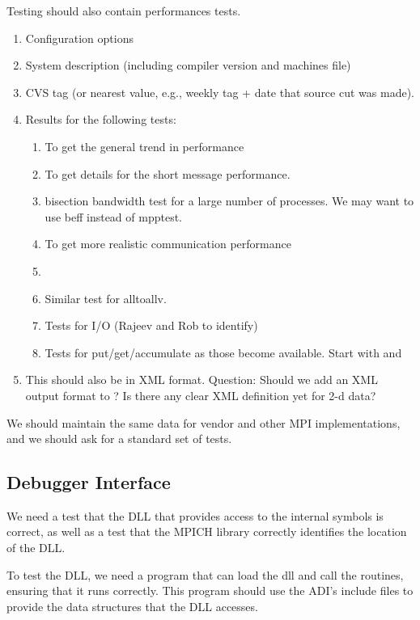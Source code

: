 \documentclass{article}
\begin{document}
Testing should also contain performances tests.
\begin{enumerate}
\item Configuration options
\item System description (including compiler version and machines file)
\item CVS tag (or nearest value, e.g., weekly tag + date that source
cut was made).
\item Results for the following tests:
    \begin{enumerate}
    \item {} To get the general trend in performance
    \item {} To get details for the short message
performance. 
    \item bisection bandwidth test for a large number of processes.
    We may want to use beff instead of mpptest.
    \item {} To get more
    realistic communication performance
    \item {} 
    \item Similar test for alltoallv. 
    \item Tests for I/O (Rajeev and Rob to identify)
    \item Tests for put/get/accumulate as those become available.
    Start with  and 
    \end{enumerate}
\item This should also be in XML format.
    Question: Should we add an XML output format to ?
Is there any clear XML definition yet for 2-d data?

\end{enumerate}
We should maintain the same data for vendor and other MPI
implementations, and we should ask for a standard set of tests.  

\subsection{Debugger Interface}
\label{sec:debug-interface}
We need a test that the DLL that provides access to the internal
symbols is correct, as well as a test that the MPICH library correctly
identifies the location of the DLL.

To test the DLL, we need a program  that can
load the dll and call the routines, ensuring that it runs correctly.
This program should use the ADI's include files to provide the data
structures that the DLL accesses.
\end{document}
